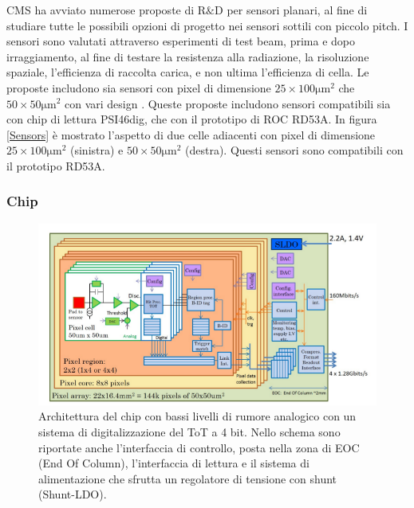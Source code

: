CMS ha avviato numerose proposte di $\mathrm{R \& D}$ per sensori planari, al fine di studiare  tutte le possibili opzioni di progetto nei sensori sottili con piccolo pitch. I sensori sono valutati attraverso esperimenti di test beam, prima e dopo irraggiamento, al fine di testare la resistenza alla radiazione, la risoluzione spaziale, l'efficienza di raccolta carica, e non ultima l'efficienza di cella. 
Le proposte includono sia sensori con pixel di dimensione $\mathrm{25 \times 100 \mu m^2}$ che $\mathrm{50 \times 50\mu m^2}$ con vari design . Queste proposte includono sensori compatibili sia con chip di lettura PSI46dig, che con il prototipo di ROC RD53A. 
In figura \ref{Sensors} è mostrato l'aspetto di due celle adiacenti con pixel di dimensione $\mathrm{25 \times 100 \mu m^2}$ (sinistra) e $\mathrm{50 \times 50\mu m^2}$ (destra). Questi sensori sono compatibili con il prototipo RD53A.

\subsubsection{Chip}

\begin{figure}
\centering
\includegraphics[scale=0.4]{Immagini/ChipBlockDiagram}
\caption{Architettura del chip con bassi livelli di rumore analogico con un sistema di digitalizzazione del ToT a 4 bit. Nello schema sono riportate anche l'interfaccia di controllo, posta nella zona di EOC (End Of Column), l'interfaccia di lettura e il sistema di alimentazione che sfrutta un regolatore di tensione con shunt (Shunt-LDO).}
\label{ChipBlockDiagram}
\end{figure}

